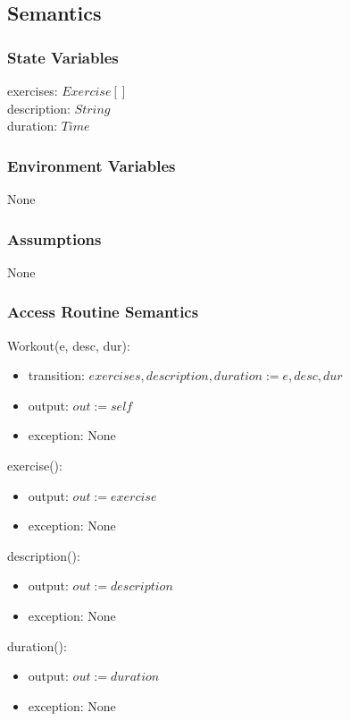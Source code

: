 \documentclass[12pt, titlepage]{article}
\begin{document}
\subsection{Semantics}

\subsubsection{State Variables}
exercises: $Exercise[]$ \\
description: $String$ \\
duration: $Time$ \\

\subsubsection{Environment Variables}
None
\subsubsection{Assumptions}
None
\subsubsection{Access Routine Semantics}

Workout(e, desc, dur):
\begin{itemize}
	\item transition: $exercises, description, duration := e, desc, dur$
	\item output: $out := self$
	\item exception: None
\end{itemize}

exercise():
\begin{itemize}
	\item output: $out := exercise$
	\item exception: None
\end{itemize}

description():
\begin{itemize}
	\item output: $out := description$
	\item exception: None
\end{itemize}

duration():
\begin{itemize}
	\item output: $out := duration$
	\item exception: None
\end{itemize}
\end{document}
